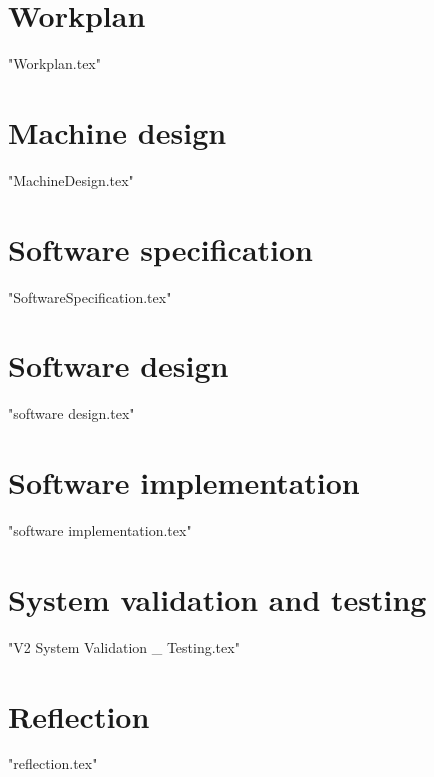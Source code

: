 \documentclass[a4paper,oneside,11pt]{report}
\begin{document}
\chapter{Workplan}
{"Workplan.tex"}

\chapter{Machine design}
{"MachineDesign.tex"} 

\chapter{Software specification}
{"SoftwareSpecification.tex"}

\chapter{Software design}
{"software design.tex"}

\chapter{Software implementation}
{"software implementation.tex"} 

\chapter{System validation and testing}
{"V2 System Validation _ Testing.tex"}

\chapter{Reflection}
{"reflection.tex"}
\end{document}
